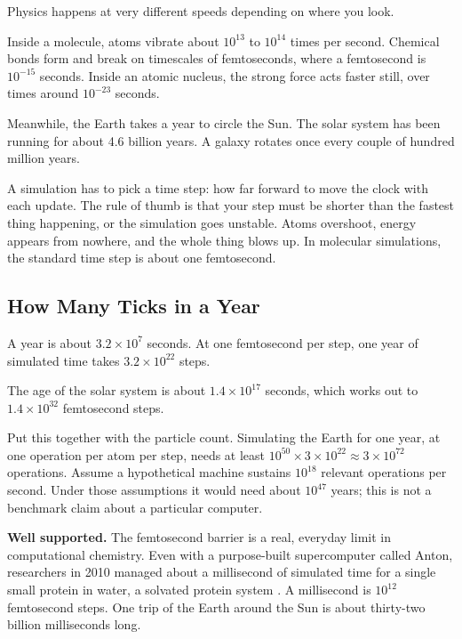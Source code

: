 Physics happens at very different speeds depending on where you look.

Inside a molecule, atoms vibrate about \(10^{13}\) to \(10^{14}\) times per second. Chemical bonds form and break on timescales of femtoseconds, where a femtosecond is \(10^{-15}\) seconds. Inside an atomic nucleus, the strong force acts faster still, over times around \(10^{-23}\) seconds.

Meanwhile, the Earth takes a year to circle the Sun. The solar system has been running for about 4.6 billion years. A galaxy rotates once every couple of hundred million years.

A simulation has to pick a time step: how far forward to move the clock with each update. The rule of thumb is that your step must be shorter than the fastest thing happening, or the simulation goes unstable. Atoms overshoot, energy appears from nowhere, and the whole thing blows up. In molecular simulations, the standard time step is about one femtosecond.

\subsection{How Many Ticks in a Year}

A year is about \(3.2 \times 10^{7}\) seconds. At one femtosecond per step, one year of simulated time takes \(3.2 \times 10^{22}\) steps.

The age of the solar system is about \(1.4 \times 10^{17}\) seconds, which works out to \(1.4 \times 10^{32}\) femtosecond steps.

Put this together with the particle count. Simulating the Earth for one year, at one operation per atom per step, needs at least \(10^{50} \times 3 \times 10^{22} \approx 3 \times 10^{72}\) operations. Assume a hypothetical machine sustains \(10^{18}\) relevant operations per second. Under those assumptions it would need about \(10^{47}\) years; this is not a benchmark claim about a particular computer.

\begin{researchnotebox}
\textbf{Well supported.} The femtosecond barrier is a real, everyday limit in computational chemistry. Even with a purpose-built supercomputer called Anton, researchers in 2010 managed about a millisecond of simulated time for a single small protein in water, a solvated protein system \cite{shaw2010}. A millisecond is \(10^{12}\) femtosecond steps. One trip of the Earth around the Sun is about thirty-two billion milliseconds long.
\end{researchnotebox}

